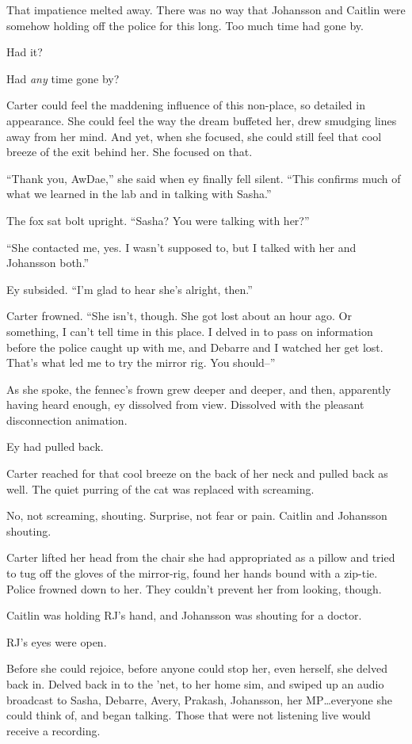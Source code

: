 That impatience melted away. There was no way that Johansson and Caitlin were somehow holding off the police for this long. Too much time had gone by.

Had it?

Had \emph{any} time gone by?

Carter could feel the maddening influence of this non-place, so detailed in appearance. She could feel the way the dream buffeted her, drew smudging lines away from her mind. And yet, when she focused, she could still feel that cool breeze of the exit behind her. She focused on that.

``Thank you, AwDae,'' she said when ey finally fell silent. ``This confirms much of what we learned in the lab and in talking with Sasha.''

The fox sat bolt upright. ``Sasha? You were talking with her?''

``She contacted me, yes. I wasn't supposed to, but I talked with her and Johansson both.''

Ey subsided. ``I'm glad to hear she's alright, then.''

Carter frowned. ``She isn't, though. She got lost about an hour ago. Or something, I can't tell time in this place. I delved in to pass on information before the police caught up with me, and Debarre and I watched her get lost. That's what led me to try the mirror rig. You should--''

As she spoke, the fennec's frown grew deeper and deeper, and then, apparently having heard enough, ey dissolved from view. Dissolved with the pleasant disconnection animation.

Ey had pulled back.

Carter reached for that cool breeze on the back of her neck and pulled back as well. The quiet purring of the cat was replaced with screaming.

No, not screaming, shouting. Surprise, not fear or pain. Caitlin and Johansson shouting.

Carter lifted her head from the chair she had appropriated as a pillow and tried to tug off the gloves of the mirror-rig, found her hands bound with a zip-tie. Police frowned down to her. They couldn't prevent her from looking, though.

Caitlin was holding RJ's hand, and Johansson was shouting for a doctor.

RJ's eyes were open.

Before she could rejoice, before anyone could stop her, even herself, she delved back in. Delved back in to the 'net, to her home sim, and swiped up an audio broadcast to Sasha, Debarre, Avery, Prakash, Johansson, her MP\ldots{}everyone she could think of, and began talking. Those that were not listening live would receive a recording.

